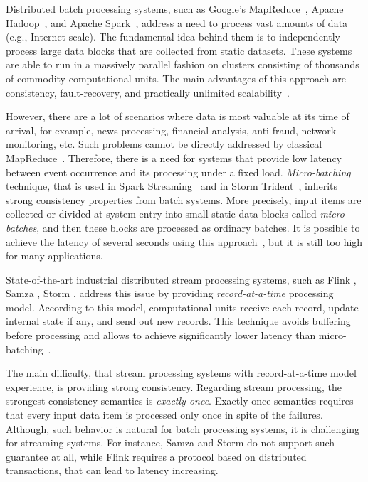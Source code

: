 
\label {fs-intro-seciton}

Distributed batch processing systems, such as Google's MapReduce~\cite{Dean:2008:MSD:1327452.1327492}, Apache Hadoop~\cite{hadoop2009hadoop}, and Apache Spark~\cite{Zaharia:2016:ASU:3013530.2934664}, address a need to process vast amounts of data (e.g., Internet-scale). The fundamental idea behind them is to independently process large data blocks that are collected from static datasets. These systems are able to run in a massively parallel fashion on clusters consisting of thousands of commodity computational units. The main advantages of this approach are consistency, fault-recovery, and practically unlimited scalability~\cite{borthakur2011apache}.

However, there are a lot of scenarios where data is most valuable at its time of arrival, for example, news processing, financial analysis, anti-fraud, network monitoring, etc. Such problems cannot be directly addressed by classical MapReduce~\cite{Doulkeridis:2014:SLA:2628707.2628782}. Therefore, there is a need for systems that provide low latency between event occurrence and its processing under a fixed load. {\it Micro-batching} technique, that is used in Spark Streaming~\cite{Zaharia:2012:DSE:2342763.2342773} and in Storm Trident~\cite{apache:storm:trident}, inherits strong consistency properties from batch systems. More precisely, input items are collected or divided at system entry into small static data blocks called {\it micro-batches}, and then these blocks are processed as ordinary batches. It is possible to achieve the latency of several seconds using this approach~\cite{7530084, 7474816}, but it is still too high for many applications.

State-of-the-art industrial distributed stream processing systems, such as Flink \cite{carbone2015apache}, Samza \cite{Noghabi:2017:SSS:3137765.3137770}, Storm \cite{apache:storm}, address this issue by providing {\it record-at-a-time} processing model. According to this model, computational units receive each record, update internal state if any, and send out new records. This technique avoids buffering before processing and allows to achieve significantly lower latency than micro-batching~\cite{7530084}.

The main difficulty, that stream processing systems with record-at-a-time model experience, is providing strong consistency. Regarding stream processing, the strongest consistency semantics is {\it exactly once}. Exactly once semantics requires that every input data item is processed only once in spite of the failures. Although, such behavior is natural for batch processing systems, it is challenging for streaming systems. For instance, Samza and Storm do not support such guarantee at all, while Flink requires a protocol based on distributed transactions, that can lead to latency increasing.

